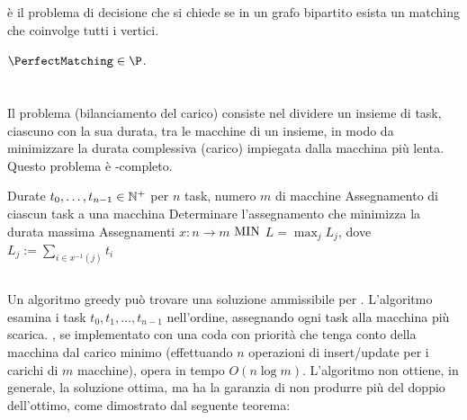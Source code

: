 \PerfectMatching è il problema di decisione che si chiede se in un grafo bipartito esista un matching che coinvolge tutti i vertici.

\begin{corollario}
	$\PerfectMatching\in\P$.
\end{corollario}



\section{\LoadBalancing}
Il problema \LoadBalancing (bilanciamento del carico) consiste nel dividere un insieme di task, ciascuno con la sua durata, tra le macchine di un insieme, in modo da minimizzare la durata complessiva (carico) impiegata dalla macchina più lenta. Questo problema è \NPO-completo.

\popt
{\LoadBalancing}
{Durate $t_0,\dots,t_{n-1}\in\mathbb N^+$ per $n$ task, numero $m$ di macchine}
{Assegnamento di ciascun task a una macchina}
{Determinare l'assegnamento che minimizza la durata massima}
{Assegnamenti $x:n\to m$}
{$\mathrm{MIN}$}
{$L=\max_j L_j$, dove $L_j:=\sum_{i\in x^{-1}(j)} t_i$}


\subsection{\GreedyLoadBalancing}
Un algoritmo greedy può trovare una soluzione ammissibile per \LoadBalancing.
L'algoritmo esamina i task $t_0,t_1,\dots,t_{n-1}$ nell'ordine, assegnando ogni task alla macchina più scarica.
\GreedyLoadBalancing, se implementato con una coda con priorità che tenga conto della macchina dal carico minimo (effettuando $n$ operazioni di insert/update per i carichi di $m$ macchine), opera in tempo $O(n\log m)$.
L'algoritmo non ottiene, in generale, la soluzione ottima, ma ha la garanzia di non produrre più del doppio dell'ottimo, come dimostrato dal seguente teorema:

